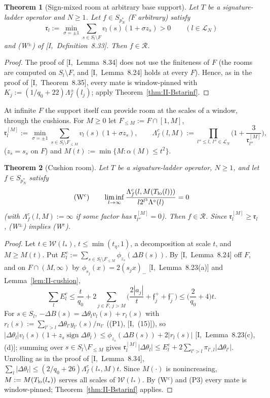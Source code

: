 \documentclass[10pt]{amsart}
\newtheorem{theorem}{Theorem}[section]
\theoremstyle{definition}
\theoremstyle{remark}
\newcommand{\sgn}{\operatorname{sign}}
\newcommand{\Rec}{\mathcal R}
\begin{document}
\begin{theorem}[Sign-mixed room at arbitrary base support]
\label{thm:II-Bpminf}
Let $T$ be a signature-ladder operator and $N\ge1$.  Let $f\in S_{p_N^*}$
\textup{(}$F$ arbitrary\textup{)} satisfy
\[
 \mathfrak r_l:=\min_{\sigma=\pm1}\sum_{s\in S_l\setminus F}v_l(s)
 (1+\sigma z_s)>0\qquad(l\in\mathcal L_N)
\]
and \textup{(W$^\pm$)} of [I,~Definition~8.33].  Then
$f\in\Rec$.
\end{theorem}

\begin{proof}
The proof of [I,~Lemma~8.34] does not use the finiteness of $F$ (the rooms
are computed on $S_l\setminus F$, and [I,~Lemma~8.24] holds at every $F$).
Hence, as in the proof of [I,~Theorem~8.35], every mate is window-pinned
with $K_j:=(1/q_0+22)\Lambda^\pm_f(l_j)$; apply
Theorem~\ref{thm:II-Bstarinf}.
\end{proof}

At infinite $F$ the support itself can provide room at the scales of a
window, through the cushions.  For $M\ge0$ let $F_{\le M}:=F\cap[1,M]$,
\[
 \mathfrak r^{[M]}_l:=\min_{\sigma=\pm1}\sum_{s\in S_l\setminus F_{\le M}}
 v_l(s)(1+\sigma z_s),\qquad\Lambda^c_f(l,M):=\prod_{l''\le l,\ l''\in
 \mathcal L_N}\Big(1+\frac3{\mathfrak r^{[M]}_{l''}}\Big),
\]
($z_s=s_s$ on $F$) and $M(t):=\min\{M:\alpha(M)\le t^2\}$.

\begin{theorem}[Cushion room]\label{thm:II-cushionroom}
Let $T$ be a signature-ladder operator, $N\ge1$, and let $f\in S_{p_N^*}$
satisfy
\[
 \textup{(W$^c$)}\qquad\liminf_{l\to\infty}\frac{\Lambda^c_f(l,M(T_{\rm lo}(l)))}
 {l2^{l^3}\Lambda^\circ(l)}=0
\]
\textup{(}with $\Lambda^c_f(l,M):=\infty$ if some factor has
$\mathfrak r^{[M]}_{l''}=0$\textup{)}.  Then $f\in\Rec$.  Since $\mathfrak r^{[M]}_l\ge\mathfrak r_l$,
\textup{(W$^\pm$)} implies \textup{(W$^c$)}.
\end{theorem}

\begin{proof}
Let $t\in\mathcal W(l_*)$, $t\le\min(t_\eta,1)$, a decomposition at scale
$t$, and $M\ge M(t)$.  Put $E^c_l:=\sum_{s\in S_l\setminus F_{\le M}}
\phi_{z_s}(\Delta B(s))$.  By [I,~Lemma~8.24] off $F$, and on $F\cap
(M,\infty)$ by $\phi_{s_j}(x)=2(s_jx)_-$ [I,~Lemma~8.23(a)] and
Lemma~\ref{lem:II-cushion},
\[
 \sum_lE^c_l\le\frac t{q_0}+2\sum_{j\in F,\,j>M}\Big(\frac{2|a_j|}t+
 \mathfrak f^+_j+\mathfrak f^-_j\Big)\le\Big(\frac2{q_0}+4\Big)t .
\]
For $s\in S_l$, $-\Delta B(s)=\Delta\theta_lv_l(s)+r_l(s)$ with
$r_l(s):=\sum_{l'>l}\Delta\theta_{l'}y_{l'}(s)/n_{l'}$ ((P1), [I,~(15)]), so
$|\Delta\theta_l|v_l(s)(1+z_s\sgn\Delta\theta_l)\le\phi_{z_s}(\Delta B(s))+
2|r_l(s)|$ [I,~Lemma~8.23(c),(d)]; summing over $s\in S_l\setminus F_{\le M}$
gives $\mathfrak r^{[M]}_l|\Delta\theta_l|\le E^c_l+2\sum_{l'>l}\pi_{l',l}
|\Delta\theta_{l'}|$.  Unrolling as in the proof of [I,~Lemma~8.34],
$\sum_l|\Delta\theta_l|\le(2/q_0+26)\Lambda^c_f(l_*,M)t$.  Since $M(\cdot)$
is nonincreasing, $M:=M(T_{\rm lo}(l_*))$ serves all scales of
$\mathcal W(l_*)$.  By (W$^c$) and (P3) every mate is window-pinned;
Theorem~\ref{thm:II-Bstarinf} applies.
\end{proof}
\end{document}
